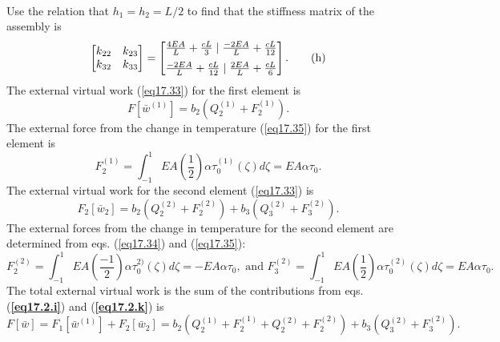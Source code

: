 \documentclass{AeroStructure-ERJohnson}
\begin{document}
\begin{example}
\begin{gather}
\end{gather}
Use the relation that $h_{1}=h_{2}=L/2$ to find that the stiffness matrix of the assembly is
\begin{equation}
\left[\begin{array}{@{}ll@{}}k_{22} & k_{23} \\k_{32} & k_{33}\end{array}\right]=\left[\begin{array}{@{}c@{}}\frac{4 E A}{L}+\frac{c L}{3} \mid \frac{-2 E A}{L}+\frac{c L}{12} \\[6pt]\frac{-2 E A}{L}+\frac{c L}{12} \mid \frac{2 E A}{L}+\frac{c L}{6}\end{array}\right]. \label{eq17.2.h}\tag{h}
\end{equation}
The external virtual work (\ref{eq17.33}) for the first element is
\begin{equation}
F\left[\bar{w}^{(1)}\right]=b_{2}\left(Q_{2}^{(1)}+F_{2}^{(1)}\right). \label{eq17.2.i}\tag{i}
\end{equation}
The external force from the change in temperature (\ref{eq17.35}) for the first element is
\begin{equation}
F_{2}^{(1)}=\int_{-1}^{1} E A\left(\frac{1}{2}\right) \alpha \tau_{0}^{(1)}(\zeta) d \zeta=E A \alpha \tau_{0}. \label{eq17.2.j}\tag{j}
\end{equation}
The external virtual work for the second element (\ref{eq17.33}) is
\begin{equation}
F_{2}\left[\bar{w}_{2}\right]=b_{2}\left(Q_2^{(2)}+F_2^{(2)}\right)+b_{3}\left(Q_{3}^{(2)}+F_{3}^{(2)}\right). \label{eq17.2.k}\tag{k}
\end{equation}
The external forces from the change in temperature for the second element are determined from eqs. (\ref{eq17.34}) and (\ref{eq17.35}):
\begin{equation}
F_{2}^{(2)}=\int_{-1}^{1} E A\left(\frac{-1}{2}\right) \alpha \tau_{0}^{2)}(\zeta) d \zeta=-E A \alpha \tau_{0}, \textrm{ and } F_{3}^{(2)}=\int_{-1}^{1} E A\left(\frac{1}{2}\right) \alpha \tau_0^{(2)}(\zeta) d \zeta=E A \alpha \tau_{0}. \label{eq17.2.l}\tag{l}
\end{equation}
The total external virtual work is the sum of the contributions from eqs. (\textbf{\ref{eq17.2.i}}) and (\textbf{\ref{eq17.2.k}}) is
\begin{equation}
F[\bar{w}]=F_{1}\left[\bar{w}^{(1)}\right]+F_{2}\left[\bar{w}_{2}\right]=b_{2}\left(Q_{2}^{(1)}+F_{2}^{(1)}+Q_{2}^{(2)}+F_{2}^{(2)}\right)+b_{3}\left(Q_{3}^{(2)}+F_{3}^{(2)}\right). \label{eq17.2.m}\tag{m}

\end{equation}
\end{example}
\end{document}
